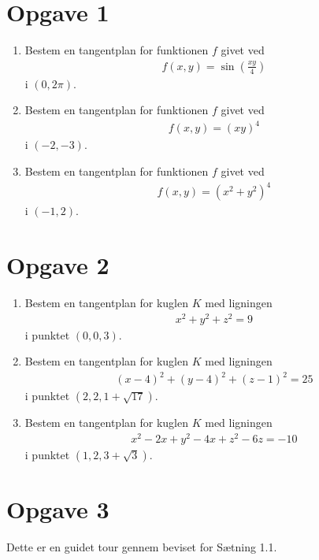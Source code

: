 \section*{Opgave 1}
\begin{enumerate}[label=\roman*)]
	\item Bestem en tangentplan for funktionen $f$ givet ved
	\begin{align*}
		f(x,y) = \sin(\frac{xy}{4}) 
	\end{align*}
	i $(0,2\pi)$. 
	\item Bestem en tangentplan for funktionen $f$ givet ved
	\begin{align*}
		f(x,y) = (xy)^4
	\end{align*}
	i $(-2,-3)$.
	\item Bestem en tangentplan for funktionen $f$ givet ved
	\begin{align*}
		f(x,y) = (x^2+y^2)^4
	\end{align*}
	i $(-1,2)$.  
\end{enumerate}

\section*{Opgave 2}

\begin{enumerate}[label=\roman*)]
	\item Bestem en tangentplan for kuglen $K$ med ligningen
	\begin{align*}
		x^2+y^2+z^2=9
	\end{align*}
	i punktet $(0,0,3)$.
	\item Bestem en tangentplan for kuglen $K$ med ligningen 
	\begin{align*}
		(x-4)^2+(y-4)^2 + (z-1)^2 = 25
	\end{align*}
	i punktet $(2,2,1+\sqrt{17})$.
	\item Bestem en tangentplan for kuglen $K$ med ligningen
	\begin{align*}
		x^2-2x+y^2-4x+z^2-6z=-10
	\end{align*}
	i punktet $(1,2,3+\sqrt{3})$. 
\end{enumerate}

\section*{Opgave 3}
Dette er en guidet tour gennem beviset for Sætning 1.1.

